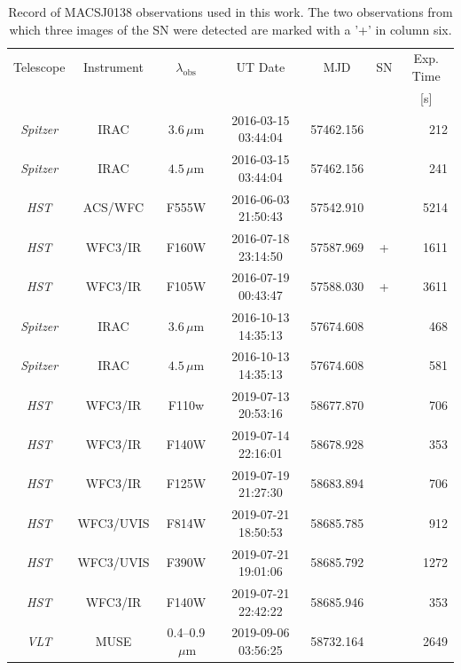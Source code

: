 \documentclass[12pt]{article}
\begin{document}
{\begin{table}[ht]
\centering
\begin{tabular}{ccccccr}
    \multicolumn{1}{c}{Telescope} & \multicolumn{1}{c}{Instrument} & \multicolumn{1}{c}{$\lambda_\mathrm{obs}$} & \multicolumn{1}{c}{UT Date} & \multicolumn{1}{c}{MJD} & \multicolumn{1}{c}{SN} & \multicolumn{1}{c}{Exp. Time}\\
 & & & & & & \multicolumn{1}{c}{[s]}\\
\midrule
\textit{Spitzer} & IRAC      & $3.6\,\mu\mathrm{m}$      & 2016-03-15 03:44:04 & 57462.156 &   & 212 \\ %
\textit{Spitzer} & IRAC      & $4.5\,\mu\mathrm{m}$      & 2016-03-15 03:44:04 & 57462.156 &   & 241 \\
\textit{HST}     & ACS/WFC   & F555W                     & 2016-06-03 21:50:43 & 57542.910 &   & 5214 \\
\textit{HST}     & WFC3/IR   & F160W                     & 2016-07-18 23:14:50 & 57587.969 & + & 1611 \\
\textit{HST}     & WFC3/IR   & F105W                     & 2016-07-19 00:43:47 & 57588.030 & + & 3611 \\ 
\textit{Spitzer} & IRAC      & $3.6\,\mu\mathrm{m}$      & 2016-10-13 14:35:13 & 57674.608 &   & 468 \\ %
\textit{Spitzer} & IRAC      & $4.5\,\mu\mathrm{m}$      & 2016-10-13 14:35:13 & 57674.608 &   & 581 \\
\midrule
\textit{HST}     & WFC3/IR   & F110w                     & 2019-07-13 20:53:16 & 58677.870 &   & 706 \\ 
\textit{HST}     & WFC3/IR   & F140W                     & 2019-07-14 22:16:01 & 58678.928 &   & 353 \\ 
\textit{HST}     & WFC3/IR   & F125W                     & 2019-07-19 21:27:30 & 58683.894 &   & 706 \\ 
\textit{HST}     & WFC3/UVIS & F814W                     & 2019-07-21 18:50:53 & 58685.785 &   & 912 \\ 
\textit{HST}     & WFC3/UVIS & F390W                     & 2019-07-21 19:01:06 & 58685.792 &   & 1272 \\ 
\textit{HST}     & WFC3/IR   & F140W                     & 2019-07-21 22:42:22 & 58685.946 &   & 353 \\ 
\textit{VLT}     & MUSE      & 0.4--0.9$\,\mu\mathrm{m}$ & 2019-09-06 03:56:25 & 58732.164 &   & 2649  \\
\end{tabular}
\caption{Record of MACSJ0138 observations used in this work.  
The two observations from which three images of the SN were detected are marked with a '+' in column six.
\label{tab:observations}
}
\end{table}

}
\end{document}
